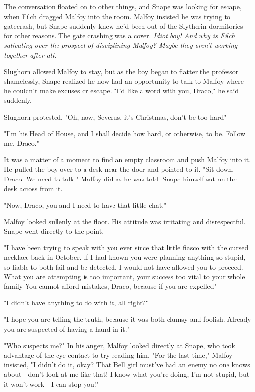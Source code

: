 The conversation floated on to other things, and Snape was looking for escape, when Filch dragged Malfoy into the room. Malfoy insisted he was trying to gatecrash, but Snape suddenly knew he'd been out of the Slytherin dormitories for other reasons. The gate crashing was a cover. \emph{Idiot boy! And why is Filch salivating over the prospect of disciplining Malfoy? Maybe they aren't working together after all.}

Slughorn allowed Malfoy to stay, but as the boy began to flatter the professor shamelessly, Snape realized he now had an opportunity to talk to Malfoy where he couldn't make excuses or escape. "I'd like a word with you, Draco," he said suddenly.

Slughorn protested. "Oh, now, Severus, it's Christmas, don't be too hard{\el}"

"I'm his Head of House, and I shall decide how hard, or otherwise, to be. Follow me, Draco."

It was a matter of a moment to find an empty classroom and push Malfoy into it. He pulled the boy over to a desk near the door and pointed to it. "Sit down, Draco. We need to talk." Malfoy did as he was told. Snape himself sat on the desk across from it.

"Now, Draco, you and I need to have that little chat."

Malfoy looked sullenly at the floor. His attitude was irritating and disrespectful. Snape went directly to the point.

"I have been trying to speak with you ever since that little fiasco with the cursed necklace back in October. If I had known you were planning anything so stupid, so liable to both fail and be detected, I would not have allowed you to proceed. What you are attempting is too important, your success too vital to your whole family{\el} You cannot afford mistakes, Draco, because if you are expelled{\el}"

"I didn't have anything to do with it, all right?"

"I hope you are telling the truth, because it was both clumsy and foolish. Already you are suspected of having a hand in it."

"Who suspects me?" In his anger, Malfoy looked directly at Snape, who took advantage of the eye contact to try reading him. "For the last time," Malfoy insisted, "I didn't do it, okay? That Bell girl must've had an enemy no one knows about—don't look at me like that! I know what you're doing, I'm not stupid, but it won't work—I can stop you!"

